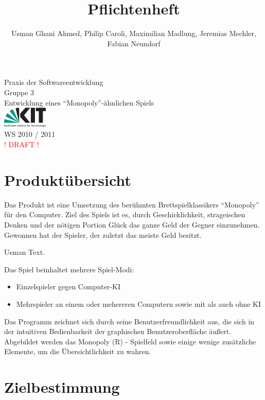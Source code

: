 \documentclass[a4paper,10pt]{article}
\title{Pflichtenheft}
\date{}
\author{Usman Ghani Ahmed, Philip Caroli, Maximilian Madlung, Jeremias Mechler, Fabian Neundorf}
\begin{document}
\maketitle
\begin{center}
\huge{Praxis der Softwareentwicklung \\
Gruppe 3 \\[0.5cm]
Entwicklung eines ``Monopoly''-ähnlichen Spiels \\[0.5cm]
\includegraphics[height=1cm]{kitlogo_de_rgb}  \\[0.5cm]
WS 2010 / 2011} \\[2cm]
\textcolor{red}{! DRAFT !}
\end{center}

\newpage

\tableofcontents

\newpage

\section{Produktübersicht}
Das Produkt ist eine Umsetzung des berühmten Brettspielklassikers ``Monopoly'' für den Computer.
Ziel des Spiels ist es, durch Geschicklichkeit, strageischen Denken und der nötigen Portion Glück das ganze Geld der Gegner einzunehmen. Gewonnen hat der Spieler, der zuletzt das meiste Geld besitzt. 

Usman Text. 

Das Spiel beinhaltet mehrere Spiel-Modi:
\begin{itemize}
\item Einzelspieler gegen Computer-KI
\item Mehrspieler an einem oder mehereren Computern sowie mit als auch ohne KI
\end{itemize}
Das Programm zeichnet sich durch seine Benutzerfreundlichkeit aus, die sich in der intuitiven Bedienbarkeit der graphischen Benutzeroberfläche äußert. Abgebildet werden das Monopoly (R) - Spielfeld sowie einige wenige zusätzliche Elemente, um die Übersichtlichkeit zu wahren. 
\section{Zielbestimmung}
\end{document}
